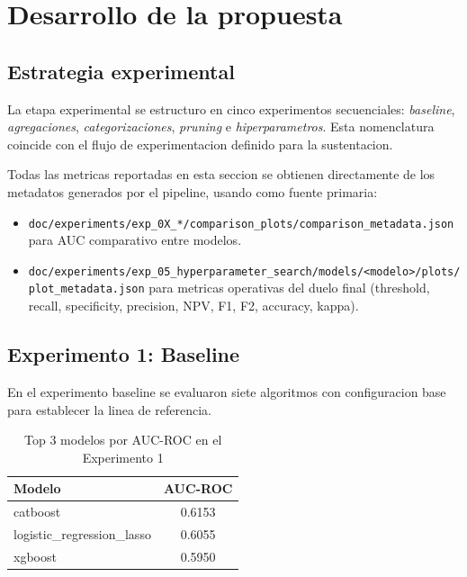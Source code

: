 \section{Desarrollo de la propuesta}

\subsection{Estrategia experimental}

La etapa experimental se estructuro en cinco experimentos secuenciales: \textit{baseline}, \textit{agregaciones}, \textit{categorizaciones}, \textit{pruning} e \textit{hiperparametros}. Esta nomenclatura coincide con el flujo de experimentacion definido para la sustentacion.

Todas las metricas reportadas en esta seccion se obtienen directamente de los metadatos generados por el pipeline, usando como fuente primaria:

\begin{itemize}
\item \texttt{doc/experiments/exp\_0X\_*/comparison\_plots/comparison\_metadata.json} para AUC comparativo entre modelos.
\item \texttt{doc/experiments/exp\_05\_hyperparameter\_search/models/<modelo>/plots/plot\_metadata.json} para metricas operativas del duelo final (threshold, recall, specificity, precision, NPV, F1, F2, accuracy, kappa).
\end{itemize}

\subsection{Experimento 1: Baseline}

En el experimento baseline se evaluaron siete algoritmos con configuracion base para establecer la linea de referencia.

\begin{table}[H]
\centering
\caption{Top 3 modelos por AUC-ROC en el Experimento 1}
\label{tab:exp1-top3}
\begin{tabular}{|l|c|}
\hline
\textbf{Modelo} & \textbf{AUC-ROC} \\ \hline
catboost & 0.6153 \\ \hline
logistic\_regression\_lasso & 0.6055 \\ \hline
xgboost & 0.5950 \\ \hline
\end{tabular}
\end{table}

